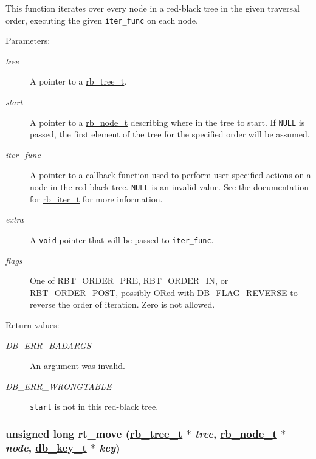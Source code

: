 This function iterates over every node in a red-black tree in the given traversal order, executing the given {\tt iter\_\-func} on each node.\begin{Desc}
\item[Parameters: ]\par
\begin{description}
\item[{\em 
tree}]A pointer to a \hyperlink{group__dbprim__rbtree_a0}{rb\_\-tree\_\-t}. \item[{\em 
start}]A pointer to a \hyperlink{group__dbprim__rbtree_a1}{rb\_\-node\_\-t} describing where in the tree to start. If {\tt NULL} is passed, the first element of the tree for the specified order will be assumed. \item[{\em 
iter\_\-func}]A pointer to a callback function used to perform user-specified actions on a node in the red-black tree. {\tt NULL} is an invalid value. See the documentation for \hyperlink{group__dbprim__rbtree_a2}{rb\_\-iter\_\-t} for more information. \item[{\em 
extra}]A {\tt void} pointer that will be passed to {\tt iter\_\-func}. \item[{\em 
flags}]One of RBT\_\-ORDER\_\-PRE, RBT\_\-ORDER\_\-IN, or RBT\_\-ORDER\_\-POST, possibly ORed with DB\_\-FLAG\_\-REVERSE to reverse the order of iteration. Zero is not allowed.\end{description}
\end{Desc}
\begin{Desc}
\item[Return values: ]\par
\begin{description}
\item[{\em 
DB\_\-ERR\_\-BADARGS}]An argument was invalid. \item[{\em 
DB\_\-ERR\_\-WRONGTABLE}]{\tt start} is not in this red-black tree. \end{description}
\end{Desc}
\hypertarget{group__dbprim__rbtree_a7}{
\subsubsection[rt\_\-move]{\setlength{\rightskip}{0pt plus 5cm}unsigned long rt\_\-move (\hyperlink{group__dbprim__rbtree_a0}{rb\_\-tree\_\-t} $\ast$ {\em tree}, \hyperlink{group__dbprim__rbtree_a1}{rb\_\-node\_\-t} $\ast$ {\em node}, \hyperlink{group__dbprim_a0}{db\_\-key\_\-t} $\ast$ {\em key})}}
\label{group__dbprim__rbtree_a7}


